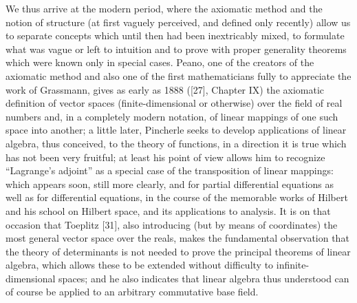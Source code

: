 We thus arrive at the modern period, where the axiomatic method and the notion of structure (at first vaguely perceived, and defined only recently) allow us to separate concepts which until then had been inextricably mixed, to formulate what was vague or left to intuition and to prove with proper generality theorems which were known only in special cases. Peano, one of the creators of the axiomatic method and also one of the first mathematicians fully to appreciate the work of Grassmann, gives as early as 1888 ({[}27{]}, Chapter IX) the axiomatic definition of vector spaces (finite-dimensional or otherwise) over the field of real numbers and, in a completely modern notation, of linear mappings of one such space into another; a little later, Pincherle seeks to develop applications of linear algebra, thus conceived, to the theory of functions, in a direction it is true which has not been very fruitful; at least his point of view allows him to recognize ``Lagrange's adjoint'' as a special case of the transposition of linear mappings: which appears soon, still more clearly, and for partial differential equations as well as for differential equations, in the course of the memorable works of Hilbert and his school on Hilbert space, and its applications to analysis. It is on that occasion that Toeplitz {[}31{]}, also introducing (but by means of coordinates) the most general vector space over the reals, makes the fundamental observation that the theory of determinants is not needed to prove the principal theorems of linear algebra, which allows these to be extended without difficulty to infinite-dimensional spaces; and he also indicates that linear algebra thus understood can of course be applied to an arbitrary commutative base field.

